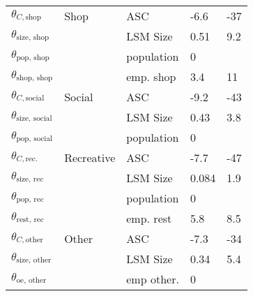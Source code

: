 \begin{table}[]
\begin{tabular}{p{\pa}p{\pb}p{\pc}p{\pd}p{\pe}}
$\theta_{C,\text{shop}}$                & Shop & ASC                               &              -6.6 &                -37 \\
$\theta_{\text{size, shop}}$            & & LSM Size                               &              0.51 &                9.2 \\
$\theta_{\text{pop, shop}}$             & & population                             &               0  &                    \\
$\theta_{\text{shop, shop}}$            & & emp. shop                       &               3.4 &                 11 \\
\noalign{\smallskip}
$\theta_{C,\text{social}}$              & Social & ASC                             &              -9.2 &                -43 \\
$\theta_{\text{size, social}}$          & & LSM Size                               &              0.43 &                3.8 \\
$\theta_{\text{pop, social}}$           & & population                             &                 0    &                    \\
\noalign{\smallskip}
$\theta_{C,\text{rec.}}$                & Recreative & ASC                         &              -7.7 &                -47 \\
$\theta_{\text{size, rec}}$             & & LSM Size                               &             0.084 &                1.9 \\
$\theta_{\text{pop, rec}}$              & & population                             &               0      &                    \\
$\theta_{\text{rest, rec}}$             & & emp. rest                      &               5.8 &                8.5 \\
\noalign{\smallskip}
$\theta_{C,\text{other}}$               & Other & ASC                              &              -7.3 &                -34 \\
$\theta_{\text{size, other}}$           & &  LSM Size                              &              0.34 &                5.4 \\
$\theta_{\text{oe, other}}$              & & emp other.                    &               0      &                    \\

    \end{tabular}

\end{table}

